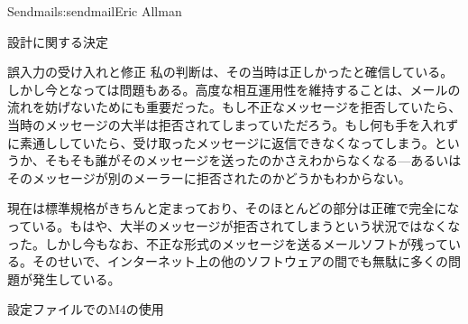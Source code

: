 \begin{aosachapter}{Sendmail}{s:sendmail}{Eric Allman}
\begin{aosasect1}{設計に関する決定}
\begin{aosasect2}{誤入力の受け入れと修正}
私の判断は、その当時は正しかったと確信している。しかし今となっては問題もある。高度な相互運用性を維持することは、メールの流れを妨げないためにも重要だった。もし不正なメッセージを拒否していたら、当時のメッセージの大半は拒否されてしまっていただろう。もし何も手を入れずに素通ししていたら、受け取ったメッセージに返信できなくなってしまう。というか、そもそも誰がそのメッセージを送ったのかさえわからなくなる---あるいはそのメッセージが別のメーラーに拒否されたのかどうかもわからない。

現在は標準規格がきちんと定まっており、そのほとんどの部分は正確で完全になっている。もはや、大半のメッセージが拒否されてしまうという状況ではなくなった。しかし今もなお、不正な形式のメッセージを送るメールソフトが残っている。そのせいで、インターネット上の他のソフトウェアの間でも無駄に多くの問題が発生している。

\end{aosasect2}

\begin{aosasect2}{設定ファイルでのM4の使用}


\end{aosasect2}
\end{aosasect1}
\end{aosachapter}
